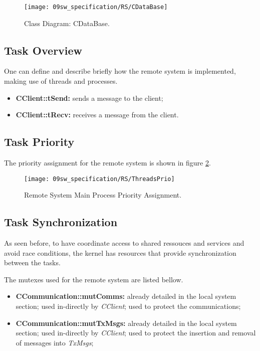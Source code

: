 \begin{figure}[H]
	\centering
	\texttt{[image: 09sw\_specification/RS/CDataBase]}
	\caption{Class Diagram: CDataBase.}
	\label{fig:CDataBase}
\end{figure}

\subsection{Task Overview}
One can define and describe briefly how the remote system is implemented, making use of threads and processes. 

\begin{itemize}
	\item \textbf{CClient::tSend:} sends a message to the client;
	\item \textbf{CClient::tRecv:} receives a message from the client.
\end{itemize}

\subsection{Task Priority}
The priority assignment for the remote system is shown in figure \ref{fig:rsPrio}. 

\begin{figure}[H]
	\centering
	\texttt{[image: 09sw\_specification/RS/ThreadsPrio]}
	\caption{Remote System Main Process Priority Assignment.}
	\label{fig:rsPrio}
\end{figure}

\subsection{Task Synchronization}
As seen before, to have coordinate access to shared ressouces and services and avoid race conditions, the kernel has resources that provide synchronization between the tasks. 


The mutexes used for the remote system are listed bellow.

\begin{itemize}
	\item \textbf{CCommunication::mutComms:} already detailed in the local system section; used in-directly by \textit{CClient}; used to protect the communications;
	\item \textbf{CCommunication::mutTxMsgs:} already detailed in the local system section; used in-directly by \textit{CClient}; used to protect the insertion and removal of messages into \textit{TxMsgs};
\end{itemize}


